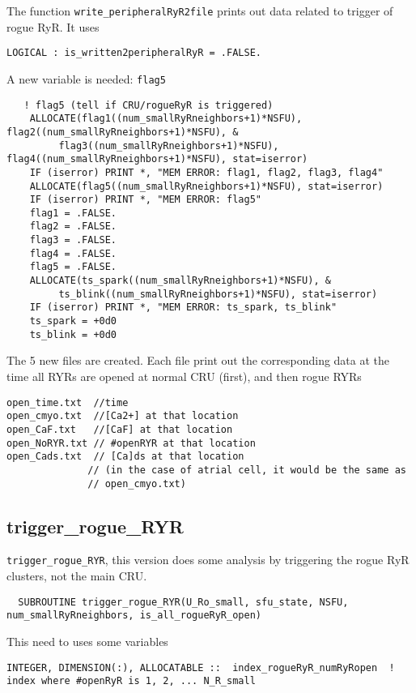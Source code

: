 The function \verb!write_peripheralRyR2file! prints out data related to trigger
of rogue RyR. It uses
\begin{verbatim}
LOGICAL : is_written2peripheralRyR = .FALSE.
\end{verbatim}
A new variable is needed: \verb!flag5!
\begin{verbatim}
   ! flag5 (tell if CRU/rogueRyR is triggered)  
    ALLOCATE(flag1((num_smallRyRneighbors+1)*NSFU), flag2((num_smallRyRneighbors+1)*NSFU), &
         flag3((num_smallRyRneighbors+1)*NSFU), flag4((num_smallRyRneighbors+1)*NSFU), stat=iserror)
    IF (iserror) PRINT *, "MEM ERROR: flag1, flag2, flag3, flag4"
    ALLOCATE(flag5((num_smallRyRneighbors+1)*NSFU), stat=iserror)
    IF (iserror) PRINT *, "MEM ERROR: flag5"    
    flag1 = .FALSE.
    flag2 = .FALSE.
    flag3 = .FALSE.
    flag4 = .FALSE.
    flag5 = .FALSE.
    ALLOCATE(ts_spark((num_smallRyRneighbors+1)*NSFU), &
         ts_blink((num_smallRyRneighbors+1)*NSFU), stat=iserror)
    IF (iserror) PRINT *, "MEM ERROR: ts_spark, ts_blink"
    ts_spark = +0d0
    ts_blink = +0d0   
\end{verbatim}

The 5 new files are created. Each file print out the corresponding data at the
time all RYRs are opened at normal CRU (first), and then rogue RYRs
\begin{verbatim}
open_time.txt  //time 
open_cmyo.txt  //[Ca2+] at that location
open_CaF.txt   //[CaF] at that location
open_NoRYR.txt // #openRYR at that location
open_Cads.txt  // [Ca]ds at that location 
              // (in the case of atrial cell, it would be the same as
              // open_cmyo.txt)
\end{verbatim}  



\subsection{trigger\_rogue\_RYR}

\verb!trigger_rogue_RYR!, this version does some analysis by triggering the
rogue RyR clusters, not the main CRU.
\begin{verbatim}
  SUBROUTINE trigger_rogue_RYR(U_Ro_small, sfu_state, NSFU, num_smallRyRneighbors, is_all_rogueRyR_open)
\end{verbatim}
This need to uses some variables
\begin{verbatim}
INTEGER, DIMENSION(:), ALLOCATABLE ::  index_rogueRyR_numRyRopen  ! index where #openRyR is 1, 2, ... N_R_small
\end{verbatim}

